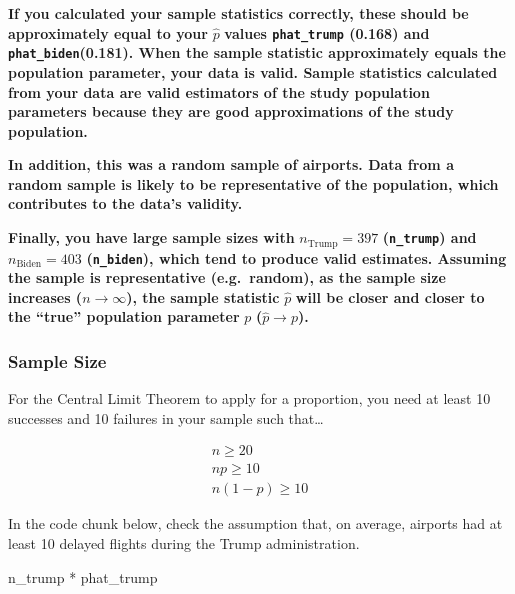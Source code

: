 \documentclass[
  letterpaper,
  DIV=11,
  numbers=noendperiod]{scrartcl}
\newenvironment{Shaded}{\begin{snugshade}}{\end{snugshade}}
\newcommand{\NormalTok}[1]{\textcolor[rgb]{0.00,0.23,0.31}{#1}}
\newcommand{\SpecialCharTok}[1]{\textcolor[rgb]{0.37,0.37,0.37}{#1}}
\begin{document}
\begin{tcolorbox}[enhanced jigsaw, colback=white, breakable, arc=.35mm, left=2mm, colframe=quarto-callout-warning-color-frame, opacityback=0, rightrule=.15mm, toprule=.15mm, bottomrule=.15mm, leftrule=.75mm]

\textbf{If you calculated your sample statistics correctly, these should
be approximately equal to your} \(\hat{p}\) \textbf{values
\texttt{phat\_trump} (0.168) and \texttt{phat\_biden}(0.181). When the
sample statistic approximately equals the population parameter, your
data is valid. Sample statistics calculated from your data are valid
estimators of the study population parameters because they are good
approximations of the study population.}

\textbf{In addition, this was a random sample of airports. Data from a
random sample is likely to be representative of the population, which
contributes to the data's validity.}

\textbf{Finally, you have large sample sizes with}
\(n_{\text{Trump}}=397\) \textbf{(\texttt{n\_trump}) and}
\(n_{\text{Biden}}=403\) \textbf{(\texttt{n\_biden}), which tend to
produce valid estimates. Assuming the sample is representative
(e.g.~random), as the sample size increases (}\(n \to \infty\)\textbf{),
the sample statistic} \(\hat{p}\) \textbf{will be closer and closer to
the ``true'' population parameter} \(p\)
\textbf{(}\(\hat{p} \to p\)\textbf{).}

\end{tcolorbox}

\subsubsection{Sample Size}\label{sample-size}

For the Central Limit Theorem to apply for a proportion, you need at
least 10 successes and 10 failures in your sample such that\ldots{}

\[
\begin{aligned}
n \ge 20 \\
np \ge 10 \\
n(1-p) \ge 10
\end{aligned}
\]

In the code chunk below, check the assumption that, on average, airports
had at least 10 delayed flights during the Trump administration.

\begin{Shaded}
\begin{Highlighting}[]
\NormalTok{n\_trump }\SpecialCharTok{*}\NormalTok{ phat\_trump}
\end{Highlighting}
\end{Shaded}
\end{document}
